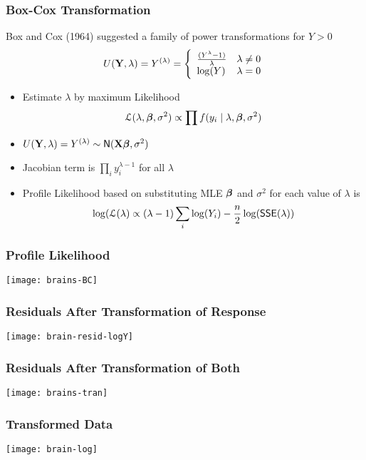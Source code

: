 \documentclass[]{beamer}
\begin{document}
  \begin{frame}
    \frametitle{Box-Cox Transformation}
    Box and Cox (1964) suggested a family of power transformations for
    $Y > 0$  \pause
$$
U(\mathbf{Y}, \lambda) =  Y^{(\lambda)} = \left\{
   \begin{array}{ll}
     \frac{(Y^\lambda -1)}{\lambda} & \lambda \neq 0 \\
 \log(Y) & \lambda = 0
   \end{array} \right.
$$  \pause

\begin{itemize}
\item Estimate $\lambda$ by maximum Likelihood  \pause
$${\cal{L}}(\lambda, \boldsymbol{\beta}, \sigma^2) \propto \prod f(y_i \mid \lambda, \boldsymbol{\beta},
\sigma^2)$$

\item  $U(\mathbf{Y}, \lambda) = Y^{(\lambda)} \sim \textsf{N}(\mathbf{X}\boldsymbol{\beta}, \sigma^2)$
  \pause
\item Jacobian term is $\prod_i y_i^{\lambda - 1}$ for all $\lambda$  \pause
\item Profile Likelihood based on substituting MLE $\boldsymbol{\beta}$ and $\sigma^2$
  for each value of $\lambda$ is 
$$\log({\cal{L}}(\lambda) \propto (\lambda -1)
\sum_i \log(Y_i) - \frac{n}{2} \log(\textsf{SSE} (\lambda))$$
\end{itemize}

  \end{frame}
  \begin{frame}
    \frametitle{ Profile Likelihood}

\centerline{\texttt{[image: brains-BC]}}
  \end{frame}

  \begin{frame}
    \frametitle{ Residuals After Transformation of Response}

\centerline{\texttt{[image: brain-resid-logY]}}

  \end{frame}
  \begin{frame}
    \frametitle{ Residuals After Transformation of Both}

\centerline{\texttt{[image: brains-tran]}}

  \end{frame}

 \begin{frame}
    \frametitle{ Transformed Data}

\centerline{\texttt{[image: brain-log]}}

  \end{frame}
\end{document}
